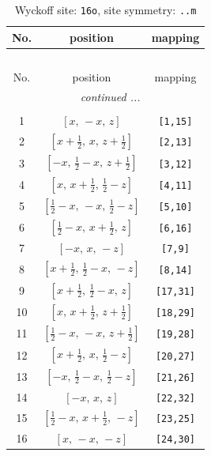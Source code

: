\documentclass[fleqn,8pt]{jsarticle}
\begin{document}
\renewcommand{\arraystretch}{1.2}
\begin{longtable}{ccc}
\caption{Wyckoff site: {\tt 16o}, site symmetry: {\tt ..m}}
 \\
 \hline \hline
No. & position & mapping \\ \hline \endfirsthead

\multicolumn{2}{l}{\tablename\ \thetable{}} \\
 \hline \hline
No. & position & mapping \\ \hline \endhead

 \hline \hline
\multicolumn{2}{r}{\footnotesize\it continued ...} \\ \endfoot

 \hline \hline
\multicolumn{2}{r}{} \\ \endlastfoot

1 & $\left[ x,\, - x,\, z \right]$ & {\tt [1,15]} \\ \hline
2 & $\left[ x + \frac{1}{2},\, x,\, z + \frac{1}{2} \right]$ & {\tt [2,13]} \\ \hline
3 & $\left[ - x,\, \frac{1}{2} - x,\, z + \frac{1}{2} \right]$ & {\tt [3,12]} \\ \hline
4 & $\left[ x,\, x + \frac{1}{2},\, \frac{1}{2} - z \right]$ & {\tt [4,11]} \\ \hline
5 & $\left[ \frac{1}{2} - x,\, - x,\, \frac{1}{2} - z \right]$ & {\tt [5,10]} \\ \hline
6 & $\left[ \frac{1}{2} - x,\, x + \frac{1}{2},\, z \right]$ & {\tt [6,16]} \\ \hline
7 & $\left[ - x,\, x,\, - z \right]$ & {\tt [7,9]} \\ \hline
8 & $\left[ x + \frac{1}{2},\, \frac{1}{2} - x,\, - z \right]$ & {\tt [8,14]} \\ \hline
9 & $\left[ x + \frac{1}{2},\, \frac{1}{2} - x,\, z \right]$ & {\tt [17,31]} \\ \hline
10 & $\left[ x,\, x + \frac{1}{2},\, z + \frac{1}{2} \right]$ & {\tt [18,29]} \\ \hline
11 & $\left[ \frac{1}{2} - x,\, - x,\, z + \frac{1}{2} \right]$ & {\tt [19,28]} \\ \hline
12 & $\left[ x + \frac{1}{2},\, x,\, \frac{1}{2} - z \right]$ & {\tt [20,27]} \\ \hline
13 & $\left[ - x,\, \frac{1}{2} - x,\, \frac{1}{2} - z \right]$ & {\tt [21,26]} \\ \hline
14 & $\left[ - x,\, x,\, z \right]$ & {\tt [22,32]} \\ \hline
15 & $\left[ \frac{1}{2} - x,\, x + \frac{1}{2},\, - z \right]$ & {\tt [23,25]} \\ \hline
16 & $\left[ x,\, - x,\, - z \right]$ & {\tt [24,30]} \\
\end{longtable}
\end{document}
